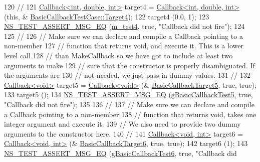 \begin{DoxyCode}
120   \textcolor{comment}{//}
121   \hyperlink{classns3_1_1Callback}{Callback<int, double, int>} target4 = 
      \hyperlink{classns3_1_1Callback}{Callback<int, double, int>} (\textcolor{keyword}{this}, &
      \hyperlink{classBasicCallbackTestCase_acded6016c8875ee1174068e28b1d464b}{BasicCallbackTestCase::Target4});
122   target4 (0.0, 1);
123   \hyperlink{group__testing_ga2a9d78cffb3db8e867c35fff0b698cf5}{NS\_TEST\_ASSERT\_MSG\_EQ} (\hyperlink{classBasicCallbackTestCase_a973d98a1c4c02aec6f3e81e9fd853346}{m\_test4}, \textcolor{keyword}{true}, \textcolor{stringliteral}{"Callback did not fire"});
124 
125   \textcolor{comment}{//}
126   \textcolor{comment}{// Make sure we can declare and compile a Callback pointing to a non-member }
127   \textcolor{comment}{// function that returns void, and execute it.  This is a lower level call}
128   \textcolor{comment}{// than MakeCallback so we have got to include at least two arguments to make}
129   \textcolor{comment}{// sure that the constructor is properly disambiguated.  If the arguments are}
130   \textcolor{comment}{// not needed, we just pass in dummy values.}
131   \textcolor{comment}{//}
132   \hyperlink{classns3_1_1Callback}{Callback<void>} target5 = \hyperlink{classns3_1_1Callback}{Callback<void>} (&
      \hyperlink{callback-test-suite_8cc_ad07263d7c54038463ca8e51768c47e34}{BasicCallbackTarget5}, \textcolor{keyword}{true}, \textcolor{keyword}{true});
133   target5 ();
134   \hyperlink{group__testing_ga2a9d78cffb3db8e867c35fff0b698cf5}{NS\_TEST\_ASSERT\_MSG\_EQ} (\hyperlink{callback-test-suite_8cc_a3ee0087a0959db41a7a5a3693cdd690d}{gBasicCallbackTest5}, \textcolor{keyword}{true}, \textcolor{stringliteral}{"Callback did
       not fire"});
135 
136   \textcolor{comment}{//}
137   \textcolor{comment}{// Make sure we can declare and compile a Callback pointing to a non-member }
138   \textcolor{comment}{// function that returns void, takes one integer argument and execute it.}
139   \textcolor{comment}{// We also need to provide two dummy arguments to the constructor here.}
140   \textcolor{comment}{//}
141   \hyperlink{classns3_1_1Callback}{Callback<void, int>} target6 = \hyperlink{classns3_1_1Callback}{Callback<void, int>} (&
      \hyperlink{callback-test-suite_8cc_a602bf8811b41389f55ea481d16cdafbf}{BasicCallbackTarget6}, \textcolor{keyword}{true}, \textcolor{keyword}{true});
142   target6 (1);
143   \hyperlink{group__testing_ga2a9d78cffb3db8e867c35fff0b698cf5}{NS\_TEST\_ASSERT\_MSG\_EQ} (\hyperlink{callback-test-suite_8cc_afdd1cb850fcd2a9bc7f212300581dfc5}{gBasicCallbackTest6}, \textcolor{keyword}{true}, \textcolor{stringliteral}{"Callback did
}
\end{DoxyCode}
